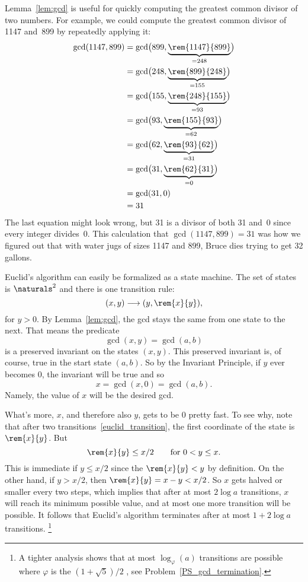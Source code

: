 Lemma~\ref{lem:gcd} is useful for quickly computing the greatest
common divisor of two numbers.  For example, we could compute the
greatest common divisor of 1147 and~899 by repeatedly applying it:
\begin{align*}
\gcd(1147, 899)
    &= \gcd\bigl(899, \underbrace{\rem{1147}{899}}_{{} = 248}\bigr) \\
    &= \gcd\bigl(248, \underbrace{\rem{899}{248}}_{{} = 155}\bigr) \\
    &= \gcd\bigl(155, \underbrace{\rem{248}{155}}_{{} = 93}\bigr) \\
    &= \gcd\bigl(93,  \underbrace{\rem{155}{93}}_{{} = 62}\bigr) \\
    &= \gcd\bigl(62,  \underbrace{\rem{93}{62}}_{{} = 31}\bigr) \\
    &= \gcd\bigl(31,  \underbrace{\rem{62}{31}}_{{} = 0}\bigr) \\
    &= \gcd(31, 0) \\
    &= 31
\end{align*}
The last equation might look wrong, but 31 is a divisor of both 31
and~0 since every integer divides~0.  This calculation that
$\gcd(1147, 899) = 31$ was how we figured out that with water jugs of
sizes 1147 and 899, Bruce dies trying to get 32 gallons.

Euclid's algorithm can easily be formalized as a state machine.  The
set of states is $\naturals^2$ and there is one transition rule:
\begin{equation}\label{euclid_transition}
(x,y) \movesto (y, \rem{x}{y}),
\end{equation}
for $y>0$.  By Lemma~\ref{lem:gcd}, the gcd stays the same from one
state to the next.  That means the predicate
\[
\gcd(x,y) = \gcd(a,b)
\]
is a preserved invariant on the states $(x,y)$.  This preserved
invariant is, of course, true in the start state $(a,b)$.  So by the
Invariant Principle, if $y$ ever becomes $0$, the invariant will be
true and so
\[
x = \gcd(x,0) = \gcd(a,b).
\]
Namely, the value of $x$ will be the desired gcd.

What's more, $x$, and therefore also $y$, gets to be 0 pretty fast.
To see why, note that after two transitions~\eqref{euclid_transition},
the first coordinate of the state is $\rem{x}{y}$.  But
\begin{equation}\label{rxylx2}
\rem{x}{y} \le x/2 \qquad \text{for $0 < y \le x$}.
\end{equation}
This is immediate if $y \le x/2$ since the $\rem{x}{y}<y$ by
definition.  On the other hand, if $y > x/2$, then $\rem{x}{y} =
x - y < x/2$.  So $x$ gets halved or smaller every two steps, which
implies that after at most $2 \log a$ transitions, $x$ will reach its
minimum possible value, and at most one more transition will be
possible.  It follows that Euclid's algorithm terminates after at most
$1+2 \log a$ transitions.
\footnote{A tighter analysis shows that at most $\log_\varphi(a)$
  transitions are possible where $\varphi$ is the 
  $(1 + \sqrt{5})/2$ , see Problem~\ref{PS_gcd_termination}.}

